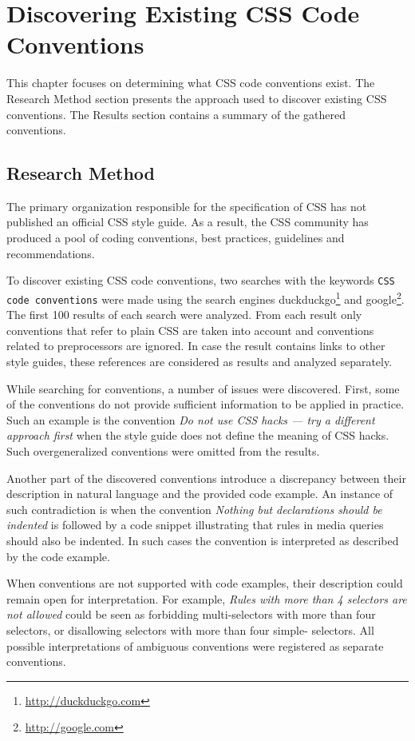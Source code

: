 \chapter{Discovering Existing CSS Code Conventions}
\label{sec:discovering}

This chapter focuses on determining what CSS code conventions exist. The
Research Method section presents the approach used to discover existing CSS
conventions. The Results section contains a summary of the gathered
conventions.

\section{Research Method}

The primary organization responsible for the specification of CSS has not
published an official CSS style guide. As a result, the CSS community has
produced a pool of coding conventions, best practices, guidelines and
recommendations.

To discover existing CSS code conventions, two searches with the keywords
\texttt{CSS code conventions} were made using the search engines
duckduckgo\footnote{\url{http://duckduckgo.com}} and
google\footnote{\url{http://google.com}}. The first 100 results of each search
were analyzed. From each result only conventions that refer to plain CSS are
taken into account and conventions related to preprocessors are ignored. In
case the result contains links to other style guides, these references are
considered as results and analyzed separately.

While searching for conventions, a number of issues were discovered. First,
some of the conventions do not provide sufficient information to be applied in
practice. Such an example is the convention \textit{Do not use CSS hacks --- try
a different approach first} when the style guide does not define the meaning
of CSS hacks. Such overgeneralized conventions were omitted from the results.

Another part of the discovered conventions introduce a discrepancy between
their description in natural language and the provided code example. An
instance of such contradiction is when the convention \textit{Nothing but
declarations should be indented} is followed by a code snippet illustrating
that rules in media queries should also be indented. In such cases the
convention is interpreted as described by the code example.

When conventions are not supported with code examples, their description could
remain open for interpretation. For example, \textit{Rules with more than 4
selectors are not allowed} could be seen as forbidding multi-selectors with
more than four selectors, or disallowing selectors with more than four simple-
selectors. All possible interpretations of ambiguous conventions were
registered as separate conventions.

